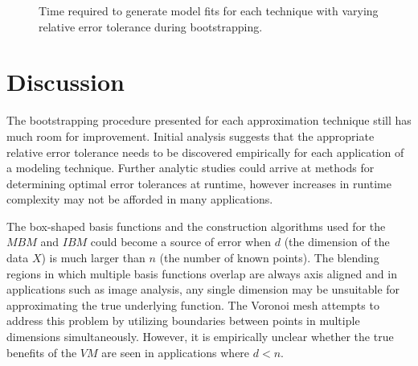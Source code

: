 \begin{figure}
  \caption{Time required to generate model fits for each technique with varying relative error tolerance during bootstrapping.
    \vspace{-.3cm}}
  \label{fig_eval_times}
\end{figure}

\section{Discussion}

The bootstrapping procedure presented for each approximation technique still has much room for improvement. Initial analysis suggests that the appropriate relative error tolerance needs to be discovered empirically for each application of a modeling technique. Further analytic studies could arrive at methods for determining optimal error tolerances at runtime, however increases in runtime complexity may not be afforded in many applications. 

The box-shaped basis functions and the construction algorithms used for the $MBM$ and $IBM$ could become a source of error when $d$ (the dimension of the data $X$) is much larger than $n$ (the number of known points). The blending regions in which multiple basis functions overlap are always axis aligned and in applications such as image analysis, any single dimension may be unsuitable for approximating the true underlying function. The Voronoi mesh attempts to address this problem by utilizing boundaries between points in multiple dimensions simultaneously. However, it is empirically unclear whether the true benefits of the $VM$ are seen in applications where $d < n$.

